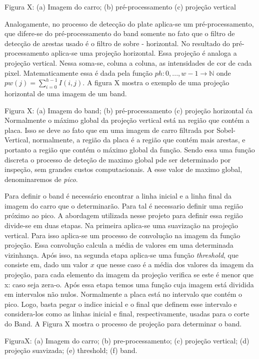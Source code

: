     Figura X: (a) Imagem do carro; (b) pré-processamento (c) projeção vertical

    Analogamente, no processo de detecção do plate aplica-se um pré-processamento, que difere-se do pré-processamento do band somente no fato que o filtro de detecção de arestas usado é o filtro de sobre - horizontal. No resultado do pré-processamento aplica-se uma projeção horizontal. Essa projeção é analoga a projeção vertical. Nessa soma-se, coluna a coluna, as intensidades de cor de cada pixel. Matematicamente essa é dada pela função $ph: {0,...,w-1}\longrightarrow \mathbb{N}$ onde $pw(j)=\sum_{i=0}^{h-1} I(i,j)$. A figura X mostra o exemplo de uma projeção horizontal de uma imagem de um band.

    Figura X: (a) Imagem do band; (b) pré-processamento (c) projeção horizontal
ća
    Normalmente o máximo global da projeção vertical está na região que contém a placa. Isso se deve ao fato que em uma imagem de carro filtrada por Sobel-Vertical, normalmente, a região da placa é a região que contém mais arestas, e portanto a região que contém o máximo global da função. Sendo essa uma função discreta o processo de deteção de maximo global pde ser determinado por inspeção, sem grandes custos computacionais. A esse valor de maximo global, denominaremos de \textit{pico}.

    Para definir o band é necessário encontrar a linha inicial e a linha final da imagem do carro que o determinarão. Para tal é necessario definir uma região próximo ao pico. A abordagem utilizada nesse projeto para definir essa região divide-se em duas etapas. Na primeira aplica-se uma suavização na projeção vertical. Para isso aplica-se um processo de convolução na imagem da função projeção. Essa convolução calcula a média de valores em uma determinada vizinhança. Após isso, na segunda etapa aplica-se uma função \textit{threshold}, que consiste em, dado um valor $x$ que nesse caso é a média dos valores da imagem da projeção, para cada elemento da imagem da projeção verifica se este é menor que x: caso seja zera-o. Após essa etapa temos uma função cuja imagem está dividida em intervalos não nulos. Normalmente a placa está no intervalo que contém o pico. Logo, basta pegar o indice inicial e o final que definem esse intervalo e considera-los como as linhas inicial e final, respectivamente, usadas para o corte do Band. A Figura X mostra o processo de projeção para determinar o band.

    FiguraX: (a) Imagem do carro; (b) pre-processamento; (c) projeção vertical; (d) projeção suavizada; (e) threshold; (f) band.

